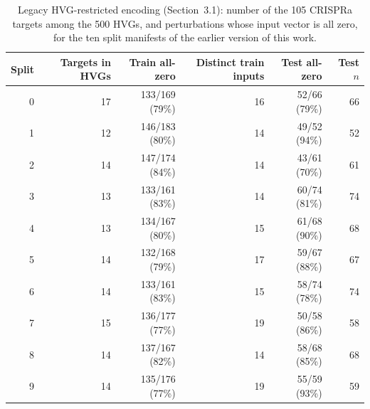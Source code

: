 \begin{table}[h]
\caption{Legacy HVG-restricted encoding (Section~3.1): number of the 105 CRISPRa targets among the 500 HVGs, and perturbations whose input vector is all zero, for the ten split manifests of the earlier version of this work.}\label{tab:audit}
\centering\small
\begin{tabular}{rrrrrr}
\toprule
Split & Targets in HVGs & Train all-zero & Distinct train inputs & Test all-zero & Test $n$ \\
\midrule
0 & 17 & 133/169 (79\%) & 16 & 52/66 (79\%) & 66 \\
1 & 12 & 146/183 (80\%) & 14 & 49/52 (94\%) & 52 \\
2 & 14 & 147/174 (84\%) & 14 & 43/61 (70\%) & 61 \\
3 & 13 & 133/161 (83\%) & 14 & 60/74 (81\%) & 74 \\
4 & 13 & 134/167 (80\%) & 15 & 61/68 (90\%) & 68 \\
5 & 14 & 132/168 (79\%) & 17 & 59/67 (88\%) & 67 \\
6 & 14 & 133/161 (83\%) & 15 & 58/74 (78\%) & 74 \\
7 & 15 & 136/177 (77\%) & 19 & 50/58 (86\%) & 58 \\
8 & 14 & 137/167 (82\%) & 14 & 58/68 (85\%) & 68 \\
9 & 14 & 135/176 (77\%) & 19 & 55/59 (93\%) & 59 \\
\bottomrule
\end{tabular}
\end{table}
